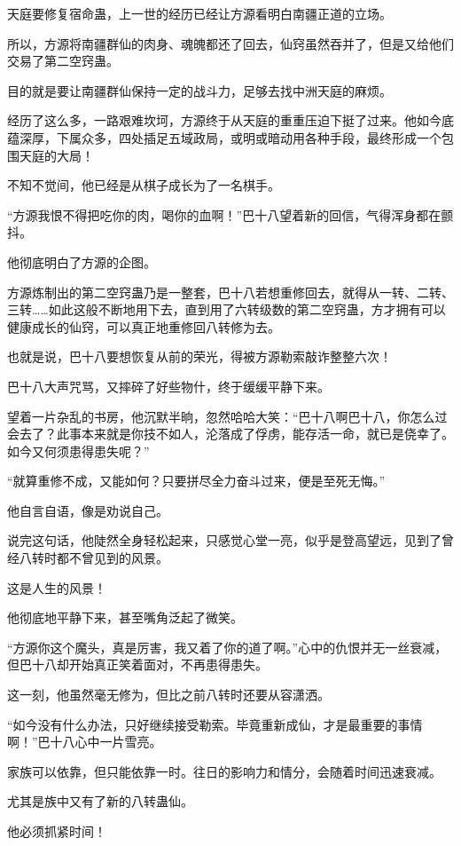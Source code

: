 \begin{this_body}
天庭要修复宿命蛊，上一世的经历已经让方源看明白南疆正道的立场。

所以，方源将南疆群仙的肉身、魂魄都还了回去，仙窍虽然吞并了，但是又给他们交易了第二空窍蛊。

目的就是要让南疆群仙保持一定的战斗力，足够去找中洲天庭的麻烦。

经历了这么多，一路艰难坎坷，方源终于从天庭的重重压迫下挺了过来。他如今底蕴深厚，下属众多，四处插足五域政局，或明或暗动用各种手段，最终形成一个包围天庭的大局！

不知不觉间，他已经是从棋子成长为了一名棋手。

“方源我恨不得把吃你的肉，喝你的血啊！”巴十八望着新的回信，气得浑身都在颤抖。

他彻底明白了方源的企图。

方源炼制出的第二空窍蛊乃是一整套，巴十八若想重修回去，就得从一转、二转、三转……如此这般不断地用下去，直到用了六转级数的第二空窍蛊，方才拥有可以健康成长的仙窍，可以真正地重修回八转修为去。

也就是说，巴十八要想恢复从前的荣光，得被方源勒索敲诈整整六次！

巴十八大声咒骂，又摔碎了好些物什，终于缓缓平静下来。

望着一片杂乱的书房，他沉默半晌，忽然哈哈大笑：“巴十八啊巴十八，你怎么过会去了？此事本来就是你技不如人，沦落成了俘虏，能存活一命，就已是侥幸了。如今又何须患得患失呢？”

“就算重修不成，又能如何？只要拼尽全力奋斗过来，便是至死无悔。”

他自言自语，像是劝说自己。

说完这句话，他陡然全身轻松起来，只感觉心堂一亮，似乎是登高望远，见到了曾经八转时都不曾见到的风景。

这是人生的风景！

他彻底地平静下来，甚至嘴角泛起了微笑。

“方源你这个魔头，真是厉害，我又着了你的道了啊。”心中的仇恨并无一丝衰减，但巴十八却开始真正笑着面对，不再患得患失。

这一刻，他虽然毫无修为，但比之前八转时还要从容潇洒。

“如今没有什么办法，只好继续接受勒索。毕竟重新成仙，才是最重要的事情啊！”巴十八心中一片雪亮。

家族可以依靠，但只能依靠一时。往日的影响力和情分，会随着时间迅速衰减。

尤其是族中又有了新的八转蛊仙。

他必须抓紧时间！


\end{this_body}
